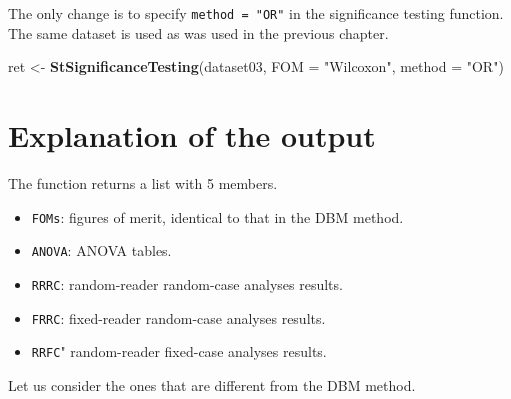 \documentclass[
]{book}
\newenvironment{Shaded}{\begin{snugshade}}{\end{snugshade}}
\newcommand{\DataTypeTok}[1]{\textcolor[rgb]{0.13,0.29,0.53}{#1}}
\newcommand{\KeywordTok}[1]{\textcolor[rgb]{0.13,0.29,0.53}{\textbf{#1}}}
\newcommand{\NormalTok}[1]{#1}
\newcommand{\StringTok}[1]{\textcolor[rgb]{0.31,0.60,0.02}{#1}}
\providecommand{\tightlist}{%
  \setlength{\itemsep}{0pt}\setlength{\parskip}{0pt}}
\begin{document}
The only change is to specify \texttt{method\ =\ "OR"} in the significance testing function. The same dataset is used as was used in the previous chapter.

\begin{Shaded}
\begin{Highlighting}[]
\NormalTok{ret <-}\StringTok{ }\KeywordTok{StSignificanceTesting}\NormalTok{(dataset03, }\DataTypeTok{FOM =} \StringTok{"Wilcoxon"}\NormalTok{, }\DataTypeTok{method =} \StringTok{"OR"}\NormalTok{)}
\end{Highlighting}
\end{Shaded}

\hypertarget{quick-start-or-text-explanation}{%
\section{Explanation of the output}\label{quick-start-or-text-explanation}}

The function returns a list with 5 members.

\begin{itemize}
\tightlist
\item
  \texttt{FOMs}: figures of merit, identical to that in the DBM method.
\item
  \texttt{ANOVA}: ANOVA tables.
\item
  \texttt{RRRC}: random-reader random-case analyses results.
\item
  \texttt{FRRC}: fixed-reader random-case analyses results.
\item
  \texttt{RRFC}" random-reader fixed-case analyses results.
\end{itemize}

Let us consider the ones that are different from the DBM method.
\end{document}
